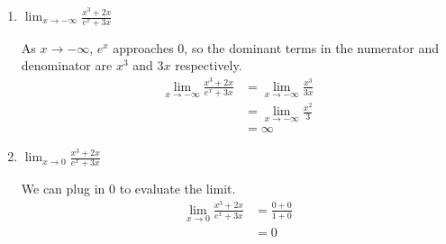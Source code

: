 \documentclass{article}
\begin{document}
\begin{enumerate}[resume]
\begin{enumerate}
    \begin{problem}[\vfill\newpage]
      $\displaystyle \lim_{x \to \infty} \frac{x^3 + 2x}{e^x + 3x}$      
    \end{problem}

    \begin{solution}
      As $x\to \infty$, the dominant terms in the numerator and denominator
      are $x^3$ and $e^x$ respectively.
      \begin{align*}
        \lim_{x \to \infty} \frac{x^3 + 2x}{e^x + 3x} &= \lim_{x \to \infty} \frac{x^3}{e^x} \\
        &= 0 \text{ since $x^3 \ll e^x$}
      \end{align*}
    \end{solution}

  \item


    \begin{problem}[\vfill]
      $\displaystyle \lim_{x \to -\infty} \frac{x^3 + 2x}{e^x + 3x}$
    \end{problem}

    \begin{solution}
      As $x\to -\infty$, $e^x$ approaches $0$, so the dominant terms in the numerator and denominator
      are $x^3$ and $3x$ respectively.
      \begin{align*}
        \lim_{x \to -\infty} \frac{x^3 + 2x}{e^x + 3x} &= 
        \lim_{x \to -\infty} \frac{x^3}{3x} \\
        &= \lim_{x \to -\infty} \frac{x^2}{3} \\
        &= \infty
      \end{align*}
    \end{solution}
    

  \item
    \begin{problem}[\vfill]
      $\displaystyle \lim_{x \to 0} \frac{x^3 + 2x}{e^x + 3x}$      
    \end{problem}

    \begin{solution}
      We can plug in $0$ to evaluate the limit.
      \begin{align*}
        \lim_{x \to 0} \frac{x^3 + 2x}{e^x + 3x} &= 
        \frac{0+0}{1 + 0} \\
        &= 0
      \end{align*}
    \end{solution}


\end{enumerate}
\end{enumerate}
\end{document}
